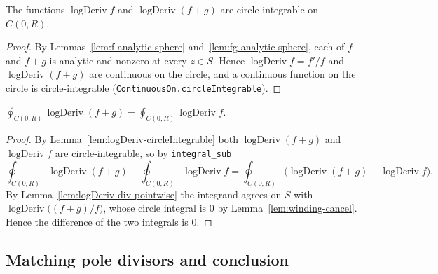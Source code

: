 \begin{lemma}
    \label{lem:logDeriv-circleIntegrable}
    \leanok
    The functions $\operatorname{logDeriv} f$ and $\operatorname{logDeriv}(f+g)$
    are circle-integrable on $C(0,R)$.
\end{lemma}
\begin{proof}
    By Lemmas~\ref{lem:f-analytic-sphere} and~\ref{lem:fg-analytic-sphere}, each of
    $f$ and $f+g$ is analytic and nonzero at every $z \in S$. Hence
    $\operatorname{logDeriv} f = f'/f$ and $\operatorname{logDeriv}(f+g)$ are
    continuous on the circle, and a continuous function on the circle is
    circle-integrable (\texttt{ContinuousOn.circleIntegrable}).
\end{proof}

\begin{lemma}
    \label{lem:logDeriv-diff}
    \leanok
    $\displaystyle \oint_{C(0,R)} \operatorname{logDeriv}(f+g)
       = \oint_{C(0,R)} \operatorname{logDeriv} f$.
\end{lemma}
\begin{proof}
    By Lemma~\ref{lem:logDeriv-circleIntegrable} both
    $\operatorname{logDeriv}(f+g)$ and $\operatorname{logDeriv} f$ are
    circle-integrable, so by \texttt{integral\_sub}
    \[
        \oint_{C(0,R)}\operatorname{logDeriv}(f+g)
          - \oint_{C(0,R)}\operatorname{logDeriv} f
          = \oint_{C(0,R)}\big(\operatorname{logDeriv}(f+g)
            - \operatorname{logDeriv} f\big).
    \]
    By Lemma~\ref{lem:logDeriv-div-pointwise} the integrand agrees on $S$ with
    $\operatorname{logDeriv}\big((f+g)/f\big)$, whose circle integral is $0$ by
    Lemma~\ref{lem:winding-cancel}. Hence the difference of the two integrals is
    $0$.
\end{proof}

\subsection{Matching pole divisors and conclusion}

